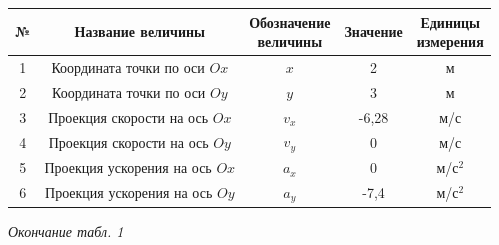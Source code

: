 \documentclass{article}
\begin{document}
\begin{tabular}{|c|c|c|c|c|}
  \hline
  \rule{0pt}{1cm} № & \hspace*{0.5cm} Название величины \hspace*{0.5cm}& \makecell{Обозначение\\ величины} & Значение & \makecell{Единицы\\ измерения} \\[0.5cm]
  \hline
  \rule{0pt}{1cm} 1  &\makecell{Координата точки по\\ оси $Ox$} & $x$ & 2 & м \\[0.5cm]
  \hline
  \rule{0pt}{1cm} 2  &\makecell{Координата точки по\\ оси $Oy$} & $y$ & 3 & м \\[0.5cm]
  \hline
  \rule{0pt}{1cm} 3  &\makecell{Проекция скорости на\\ ось $Ox$} & $v_x$ & -6,28 & м/с \\[0.5cm]
  \hline
  \rule{0pt}{1cm} 4  &\makecell{Проекция скорости на\\ ось $Oy$} & $v_y$ & 0 & м/с \\[0.5cm]
  \hline
  \rule{0pt}{1cm} 5  &\makecell{Проекция ускорения на\\ ось $Ox$} & $a_x$ & 0 & м/с$^2$ \\[0.5cm]
  \hline
  \rule{0pt}{1cm} 6  &\makecell{Проекция ускорения на\\ ось $Oy$} & $a_y$ & -7,4 & м/с$^2$ \\[0.5cm]
  \hline
\end{tabular}

\newpage

\begin{flushright}
  \small\textit{Окончание табл. 1} \hspace*{0.4cm}
\end{flushright}
\end{document}
